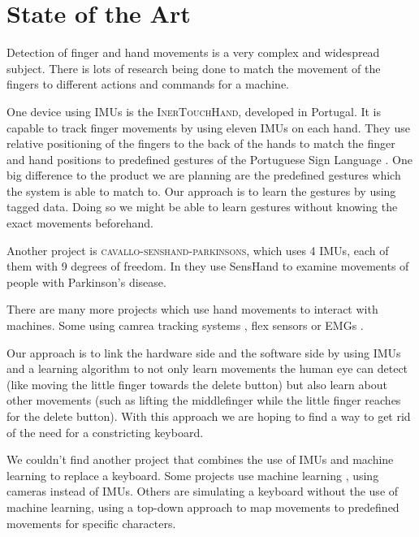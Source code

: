 \section{State of the Art}
Detection of finger and hand movements is a very complex and widespread subject. There is lots of research being done to match the movement of the fingers to different actions and commands for a machine.

One device using IMUs is the \textsc{InerTouchHand}, developed in Portugal. It is capable to track finger movements by using eleven IMUs on each hand. They use relative positioning of the fingers to the back of the hands to match the finger and hand positions to predefined gestures of the Portuguese Sign Language \cite{inertouchhand}. One big difference to the product we are planning are the predefined gestures which the system is able to match to. Our approach is to learn the gestures by using tagged data. Doing so we might be able to learn gestures without knowing the exact movements beforehand.

Another project is \textsc{cavallo-senshand-parkinsons}, which uses 4 IMUs, each of them with 9 degrees of freedom. In \cite{cavallo-senshand-parkinsons} they use SensHand to examine movements of people with Parkinson's disease.

There are many more projects which use hand movements to interact with machines. Some using camrea tracking systems \cite{ellithorpe-kinect-typing}, flex sensors or EMGs \cite{imu-emg}.

Our approach is to link the hardware side and the software side by using IMUs and a learning algorithm to not only learn movements the human eye can detect (like moving the little finger towards the delete button) but also learn about other movements (such as lifting the middlefinger while the little finger reaches for the delete button). With this approach we are hoping to find a way to get rid of the need for a constricting keyboard.

We couldn't find another project that combines the use of IMUs and machine learning to replace a keyboard.
Some projects use machine learning \cite{ellithorpe-kinect-typing}, using cameras instead of IMUs. Others are simulating a keyboard without the use of machine learning, using a top-down approach to map movements to predefined movements for specific characters.

